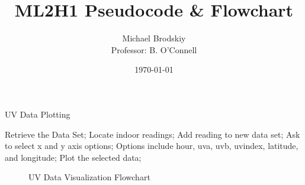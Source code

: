 


\title{ML2H1 Pseudocode \& Flowchart}
\date{\today}
\author{Michael Brodskiy\\ \small Professor: B. O'Connell}



\maketitle

    \begin{algorithm}
      \caption{UV Data Plotting}\label{UVData}
      \begin{algorithmic}[1]
        \State Retrieve the Data Set;
        \State Locate indoor readings;
                \State Add reading to new data set;
            \EndIf
        \EndFor
            {Ask to select x and y axis options};
            \State Options include hour, uva, uvb, uvindex, latitude, and longitude;
            \State Plot the selected data;
        \EndFor
        \EndProcedure
      \end{algorithmic}
    \end{algorithm}

\begin{figure}[H]
  \centering
  
  \caption{UV Data Visualization Flowchart}
  \label{fig:1}
\end{figure}



